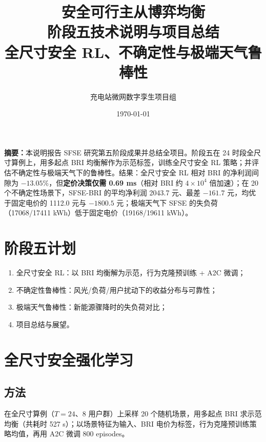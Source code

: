 \documentclass[UTF8,a4paper,11pt]{ctexart}
\title{\vspace{-1.4cm}\textbf{\color{mainblue}安全可行主从博弈均衡\\阶段五技术说明与项目总结}\\[6pt]
\large 全尺寸安全 RL、不确定性与极端天气鲁棒性}
\author{充电站微网数字孪生项目组}
\date{\today}
\begin{document}
\sloppy
\maketitle
\thispagestyle{fancy}

\begin{center}
\begin{minipage}{0.93\textwidth}
\small
\textbf{摘要：}本说明报告 SFSE 研究第五阶段成果并总结全项目。阶段五在 24 时段全尺寸算例上，用多起点 BRI 均衡解作为示范标签，训练全尺寸安全 RL 策略；并评估不确定性与极端天气下的鲁棒性。结果：全尺寸安全 RL 相对 BRI 的净利润间隙为 $-13.05\%$，但\textbf{定价决策仅需 0.69 ms}（相对 BRI 约 $4\times10^4$ 倍加速）；在 20 个不确定性场景下，SFSE-BRI 的平均净利润 2043.7 元、最差 $-161.7$ 元，均优于固定电价的 1112.0 元与 $-1800.5$ 元；极端天气下 SFSE 的失负荷（17068/17411 kWh）低于固定电价（19168/19611 kWh）。
\end{minipage}
\end{center}

\vspace{0.4cm}

\section{阶段五计划}
\begin{enumerate}
  \item 全尺寸安全 RL：以 BRI 均衡解为示范，行为克隆预训练 + A2C 微调；
  \item 不确定性鲁棒性：风光/负荷/用户扰动下的收益分布与可靠性；
  \item 极端天气鲁棒性：新能源骤降时的失负荷对比；
  \item 项目总结与展望。
\end{enumerate}

\section{全尺寸安全强化学习}

\subsection{方法}
在全尺寸算例（$T=24$、8 用户群）上采样 20 个随机场景，用多起点 BRI 求示范均衡（共耗时 527 s）；以场景特征为输入、BRI 电价为标签，行为克隆预训练策略均值，再用 A2C 微调 800 episodes。
\end{document}
